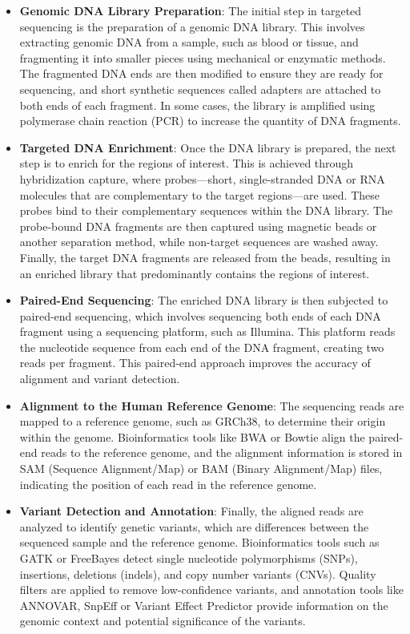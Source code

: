 \documentclass[a4paper,12pt,twoside]{ThesisStyle}
\begin{document}
\begin{itemize}
    \item \textbf{Genomic DNA Library Preparation}: The initial step in targeted sequencing is the preparation of a genomic DNA library. This involves extracting genomic DNA from a sample, such as blood or tissue, and fragmenting it into smaller pieces using mechanical or enzymatic methods. The fragmented DNA ends are then modified to ensure they are ready for sequencing, and short synthetic sequences called adapters are attached to both ends of each fragment. In some cases, the library is amplified using polymerase chain reaction (PCR) to increase the quantity of DNA fragments.
    
    \item \textbf{Targeted DNA Enrichment}: Once the DNA library is prepared, the next step is to enrich for the regions of interest. This is achieved through hybridization capture, where probes—short, single-stranded DNA or RNA molecules that are complementary to the target regions—are used. These probes bind to their complementary sequences within the DNA library. The probe-bound DNA fragments are then captured using magnetic beads or another separation method, while non-target sequences are washed away. Finally, the target DNA fragments are released from the beads, resulting in an enriched library that predominantly contains the regions of interest.

    \item \textbf{Paired-End Sequencing}: The enriched DNA library is then subjected to paired-end sequencing, which involves sequencing both ends of each DNA fragment using a sequencing platform, such as Illumina. This platform reads the nucleotide sequence from each end of the DNA fragment, creating two reads per fragment. This paired-end approach improves the accuracy of alignment and variant detection.
    
    \item \textbf{Alignment to the Human Reference Genome}: The sequencing reads are mapped to a reference genome, such as GRCh38, to determine their origin within the genome. Bioinformatics tools like BWA or Bowtie align the paired-end reads to the reference genome, and the alignment information is stored in SAM (Sequence Alignment/Map) or BAM (Binary Alignment/Map) files, indicating the position of each read in the reference genome.
    
    \item \textbf{Variant Detection and Annotation}: Finally, the aligned reads are analyzed to identify genetic variants, which are differences between the sequenced sample and the reference genome. Bioinformatics tools such as GATK or FreeBayes detect single nucleotide polymorphisms (SNPs), insertions, deletions (indels), and copy number variants (CNVs). Quality filters are applied to remove low-confidence variants, and annotation tools like ANNOVAR, SnpEff or Variant Effect Predictor provide information on the genomic context and potential significance of the variants.

\end{itemize}
\end{document}
